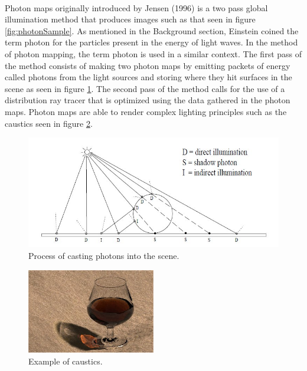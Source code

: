 \paragraph{}
Photon maps originally introduced by Jensen (1996) is a two pass global illumination method that produces images such as that seen in figure \ref{fig:photonSample}.  As mentioned in the Background section, Einstein coined the term photon for the particles present in the energy of light waves.  In the method of photon mapping, the term photon is used in a similar context.  The first pass of the method consists of making two photon maps by emitting packets of energy called photons from the light sources and storing where they hit surfaces in the scene as seen in figure \ref{fig:photonCalc}.  The second pass of the method calls for the use of a distribution ray tracer that is optimized using the data gathered in the photon maps.  Photon maps are able to render complex lighting principles such as the caustics seen in figure \ref{fig:photonCaustics}.

\begin{figure}[h!]
  \centering
    \includegraphics[width=1.0\textwidth]{photonCalc.jpg}
  \caption{Process of casting photons into the scene.}
	\label{fig:photonCalc}
\end{figure}

\begin{figure}[h!]
  \centering
    \includegraphics[width=0.5\textwidth]{photonCaustics.jpg}
  \caption{Example of caustics.}
	\label{fig:photonCaustics}
\end{figure}


